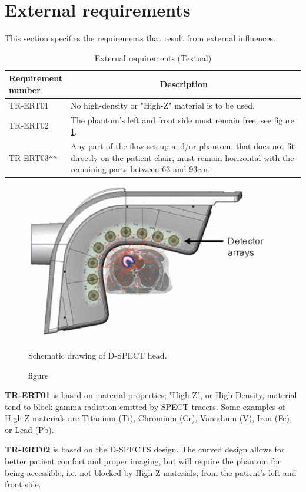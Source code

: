 \section{External requirements}
This section specifies the requirements that result from external influences.
\begin{table} [H]
\caption{External requirements (Textual)}
\label{tab:extreq_text}
\begin{tabular}{l|p{120mm}|}
	\makecell[l]{\textbf{Requirement} \\ \textbf{number}} & \multicolumn{1}{c}{\textbf{Description}}\\
	\hline
	TR-ERT01 & No high-density or "High-Z" material is to be used.\\ 
	TR-ERT02 & The phantom's left and front side must remain free, see figure \ref{fig:spect_surround}. \\ 
	\sout{TR-ERT03**} & \sout{Any part of the flow set-up and/or phantom, that does not fit directly on the patient chair, must remain horizontal with the remaining parts between 63 and 93cm.} \\
	\cline{2-2}
\end{tabular}
\raggedright

\end{table}

\begin{figure} [H]
  \includegraphics[width=0.5\linewidth]{./images/surrounding_spect.jpg}
  \caption{figure}{Schematic drawing of D-SPECT head\citep{erlandsson2009performance}.}
  \label{fig:spect_surround}
\end{figure}

\textbf{TR-ERT01} is based on material properties; "High-Z", or High-Density, material tend to block gamma radiation emitted by \ac{SPECT} tracers. Some examples of High-Z materials are Titanium (Ti), Chromium (Cr), Vanadium (V), Iron (Fe), or Lead (Pb).

\textbf{TR-ERT02} is based on the D-SPECTS design. The curved design allows for better patient comfort and proper imaging, but will require the phantom for being accessible, i.e. not blocked by High-Z materials, from the patient's left and front side.

